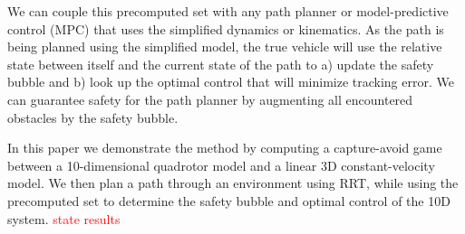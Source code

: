 We can couple this precomputed set with any path planner or model-predictive control (MPC) that uses the simplified dynamics or kinematics. As the path is being planned using the simplified model, the true vehicle will use the relative state between itself and the current state of the path to a) update the safety bubble and b) look up the optimal control that will minimize tracking error. We can guarantee safety for the path planner by augmenting all encountered obstacles by the safety bubble.

In this paper we demonstrate the method by computing a capture-avoid game between a 10-dimensional quadrotor model and a linear 3D constant-velocity model. We then plan a path through an environment using RRT, while using the precomputed set to determine the safety bubble and optimal control of the 10D system. \textcolor{red}{state results}